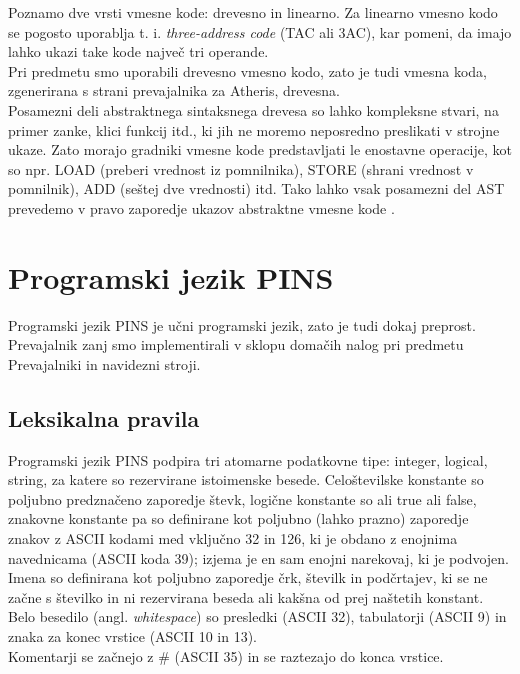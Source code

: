\documentclass[a4paper, 12p]{book}
\begin{document}
Poznamo dve vrsti vmesne kode: drevesno in linearno. Za linearno vmesno kodo se pogosto uporablja t. i. \textit{three-address code} (TAC ali 3AC), kar pomeni, da imajo lahko ukazi take kode največ tri operande. \\
\indent Pri predmetu smo uporabili drevesno vmesno kodo, zato je tudi vmesna koda, zgenerirana s strani prevajalnika za Atheris, drevesna.\\
\indent Posamezni deli abstraktnega sintaksnega drevesa so lahko kompleksne stvari, na primer zanke, klici funkcij itd., ki jih ne moremo neposredno preslikati v strojne ukaze. Zato morajo gradniki vmesne kode predstavljati le enostavne operacije, kot so npr. LOAD (preberi vrednost iz pomnilnika), STORE (shrani vrednost v pomnilnik), ADD (seštej dve vrednosti) itd. Tako lahko vsak posamezni del AST prevedemo v pravo zaporedje ukazov abstraktne vmesne kode \cite{modernCompiler}. \\ 

\chapter{Programski jezik PINS}

Programski jezik PINS je učni programski jezik, zato je tudi dokaj preprost. Prevajalnik zanj smo implementirali v sklopu domačih nalog pri predmetu Prevajalniki in navidezni stroji.

\section{Leksikalna pravila}

Programski jezik PINS podpira tri atomarne podatkovne tipe: {\ttfamily integer},  {\ttfamily logical}, {\ttfamily string}, za katere so rezervirane istoimenske besede. Celoštevilske konstante so poljubno predznačeno zaporedje števk, logične konstante so ali {\ttfamily true} ali {\ttfamily false}, znakovne konstante pa so definirane kot poljubno (lahko prazno) zaporedje znakov z ASCII kodami med vključno 32 in 126, ki je obdano z enojnima navednicama (ASCII koda 39); izjema je en sam enojni narekovaj, ki je podvojen. \\
\indent Imena so definirana kot poljubno zaporedje črk, številk in podčrtajev, ki se ne začne s številko in ni rezervirana beseda ali kakšna od prej naštetih konstant. \\
\indent Belo besedilo (angl. \textit{whitespace}) so presledki (ASCII 32), tabulatorji (ASCII 9) in znaka za konec vrstice (ASCII 10 in 13). \\
\indent Komentarji se začnejo z {\ttfamily \#} (ASCII 35) in se raztezajo do konca vrstice.
\end{document}
